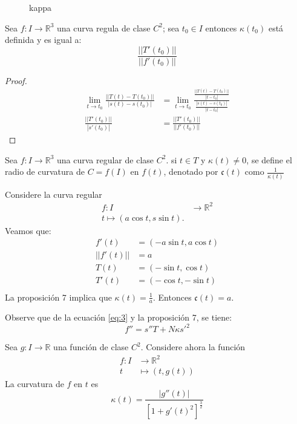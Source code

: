 \begin{figure}[ht]
  \centering
  \caption{kappa}
  \label{fig:kappa}
\end{figure}
\begin{proposition}
  Sea $f:I \to \mathbb{R}^3$ una curva regula de clase $C^2$; sea $t_0 \in I$
  entonces $\kappa(t_0)$ está definida y es igual a:
  \[
    \frac{||T'(t_0)||}{||f'(t_0)||}
  \]
\end{proposition}
\begin{proof}
  \begin{align*}
    \lim_{t \to t_0} \frac{||T(t) - T(t_0)||}{|s(t)- s(t_0)|} &=
    \lim_{t \to t_0}\frac{\frac{||T(t)- T(t_0)||}{|t-t_0|}}{\frac{|s(t)-s(t_0)|}{|t-t_0|}} \\
    \frac{||T'(t_0)||}{|s'(t_0)|} &= \frac{||T'(t_0)||}{||f'(t_0)||}
  \end{align*} 
\end{proof}
\begin{definition}
  Sea $f: I \to \mathbb{R}^3$ una curva regular de clase $C^2$. si $t \in T$ y
  $\kappa(t) \neq 0$, se define el radio de curvatura de $C = f(I)$ en $f(t)$,
  denotado por $\mathfrak{c}(t)$ como $\frac{1}{\kappa(t)}$
\end{definition}
\begin{example}
  Considere la curva regular 
  \begin{align*}
    f: I &\to \mathbb{R}^2 \\
    t \mapsto (a\cos t, s \sin t).
  \end{align*}
  Veamos que:
  \begin{align*}
    f'(t) &= (- a \sin t, a \cos t) \\
    ||f'(t)|| &= a \\
    T(t) &= (- \sin t, \cos t) \\
    T'(t) &= (- \cos t, -\sin t) \\
  \end{align*}
  La proposición 7 implica que $\kappa(t) = \frac{1}{a}$. Entonces
  $\mathfrak{c}(t) = a$.

\end{example}
Observe que de la ecuación \eqref{eq:3} y la proposición 7, se tiene:
\begin{equation}\label{eq:4}
  f'' = s''T + N\kappa s'^2 
\end{equation}
\begin{proposition}
  Sea $g: I \to \mathbb{R}$ una función de clase $C^2$. Considere ahora la
  función 
  \begin{align*}
    f: I &\to \mathbb{R}^2\\
    t &\mapsto (t, g(t))
  \end{align*}
  La curvatura de $f$ en $t$ es 
  \[
    \kappa(t) =  \frac{|g''(t)|}{[1 + g'(t)^2]^{\frac{3}{2}}}
  \]
\end{proposition}
